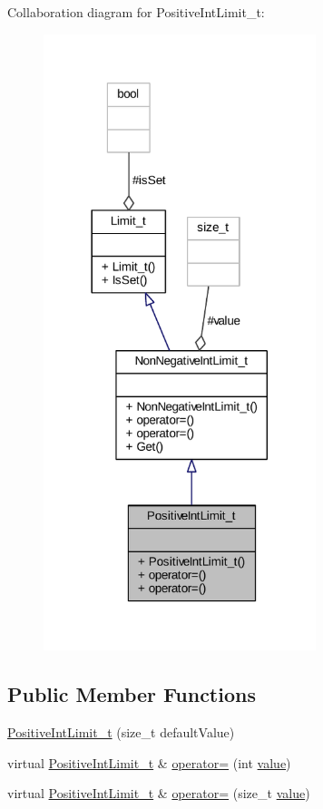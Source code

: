 Collaboration diagram for Positive\+Int\+Limit\+\_\+t\+:
\nopagebreak
\begin{figure}[H]
\begin{center}
\leavevmode
\includegraphics[width=225pt]{struct_positive_int_limit__t__coll__graph}
\end{center}
\end{figure}
\subsection*{Public Member Functions}
\begin{DoxyCompactItemize}
\item 
\hyperlink{struct_positive_int_limit__t_a8242be57438e3463979e5fda94aeba94}{Positive\+Int\+Limit\+\_\+t} (size\+\_\+t default\+Value)
\item 
virtual \hyperlink{struct_positive_int_limit__t}{Positive\+Int\+Limit\+\_\+t} \& \hyperlink{struct_positive_int_limit__t_a2e2aed2b4aaa798bd3bf5e74775c8aac}{operator=} (int \hyperlink{class_non_negative_int_limit__t_ac6fe50d9fcbdaf452a31178bfa2dff56}{value})
\item 
virtual \hyperlink{struct_positive_int_limit__t}{Positive\+Int\+Limit\+\_\+t} \& \hyperlink{struct_positive_int_limit__t_aa03a2f83b277e9bb12e894f8cc9c286a}{operator=} (size\+\_\+t \hyperlink{class_non_negative_int_limit__t_ac6fe50d9fcbdaf452a31178bfa2dff56}{value})
\end{DoxyCompactItemize}
